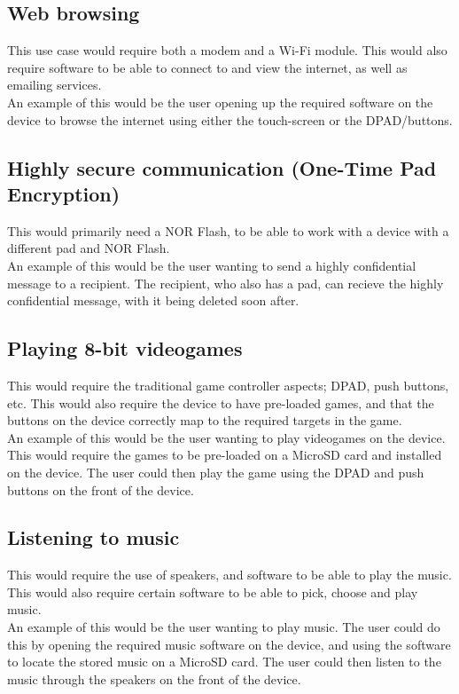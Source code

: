 \subsection{Web browsing}
	This use case would require both a modem and a Wi-Fi module. This would also require software to be able to connect to and view the internet, as well as emailing services.\\
	An example of this would be the user opening up the required software on the device to browse the internet using either the touch-screen or the DPAD/buttons.

\subsection{Highly secure communication (One-Time Pad Encryption)}
	This would primarily need a NOR Flash, to be able to work with a device with a different pad and NOR Flash.\\
	An example of this would be the user wanting to send a highly confidential message to a recipient. The recipient, who also has a pad, can recieve the highly confidential message, with it being deleted soon after. 

\subsection{Playing 8-bit videogames}
	This would require the traditional game controller aspects; DPAD, push buttons, etc. This would also require the device to have pre-loaded games, and that the buttons on the device correctly map to the required targets in the game.\\
	An example of this would be the user wanting to play videogames on the device. This would require the games to be pre-loaded on a MicroSD card and installed on the device. The user could then play the game using the DPAD and push buttons on the front of the device.

\subsection{Listening to music}
	This would require the use of speakers, and software to be able to play the music. This would also require certain software to be able to pick, choose and play music.\\
	An example of this would be the user wanting to play music. The user could do this by opening the required music software on the device, and using the software to locate the stored music on a MicroSD card. The user could then listen to the music through the speakers on the front of the device.


